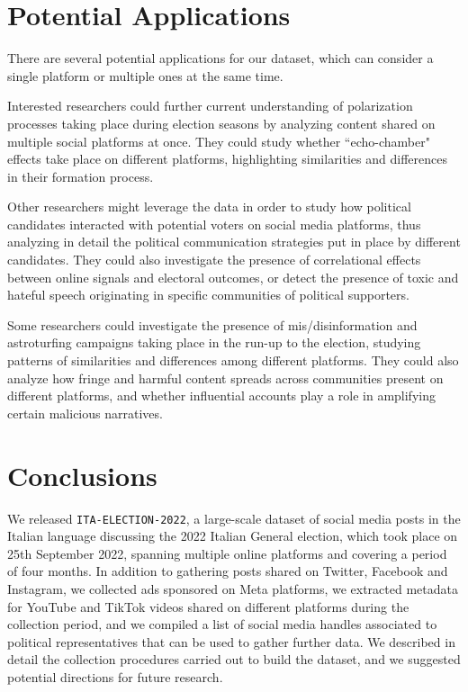 \documentclass[sigconf,screen]{acmart}
\begin{document}
\section{Potential Applications}
There are several potential applications for our dataset, which can consider a single platform or multiple ones at the same time.

Interested researchers could further current understanding of polarization processes taking place during election seasons by analyzing content shared on multiple social platforms at once. They could study whether ``echo-chamber" effects take place on different platforms, highlighting similarities and differences in their formation process.

Other researchers might leverage the data in order to study how political candidates interacted with potential voters on social media platforms, thus analyzing in detail the political communication strategies put in place by different candidates. They could also investigate the presence of correlational effects between online signals and electoral outcomes, or detect the presence of toxic and hateful speech originating in specific communities of political supporters. 

Some researchers could investigate the presence of mis/disinformation and astroturfing campaigns taking place in the run-up to the election, studying patterns of similarities and differences among different platforms. They could also analyze how fringe and harmful content spreads across communities present on different platforms, and whether influential accounts play a role in amplifying certain malicious narratives.

\section{Conclusions}
We released \texttt{ITA-ELECTION-2022}, a large-scale dataset of social media posts in the Italian language discussing the 2022 Italian General election, which took place on 25th September 2022, spanning multiple online platforms and covering a period of four months. In addition to gathering posts shared on Twitter, Facebook and Instagram, we collected ads sponsored on Meta platforms, we extracted metadata for YouTube and TikTok videos shared on different platforms during the collection period, and we compiled a list of social media handles associated to political representatives that can be used to gather further data. We described in detail the collection procedures carried out to build the dataset, and we suggested potential directions for future research.
\end{document}
